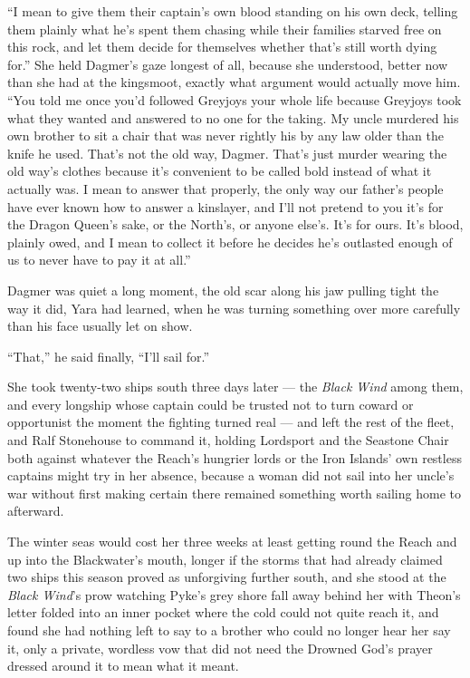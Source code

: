 “I mean to give them their captain’s own blood standing on his own deck, telling them plainly what he’s spent them chasing while their families starved free on this rock, and let them decide for themselves whether that’s still worth dying for.” She held Dagmer’s gaze longest of all, because she understood, better now than she had at the kingsmoot, exactly what argument would actually move him. “You told me once you’d followed Greyjoys your whole life because Greyjoys took what they wanted and answered to no one for the taking. My uncle murdered his own brother to sit a chair that was never rightly his by any law older than the knife he used. That’s not the old way, Dagmer. That’s just murder wearing the old way’s clothes because it’s convenient to be called bold instead of what it actually was. I mean to answer that properly, the only way our father’s people have ever known how to answer a kinslayer, and I’ll not pretend to you it’s for the Dragon Queen’s sake, or the North’s, or anyone else’s. It’s for ours. It’s blood, plainly owed, and I mean to collect it before he decides he’s outlasted enough of us to never have to pay it at all.”

Dagmer was quiet a long moment, the old scar along his jaw pulling tight the way it did, Yara had learned, when he was turning something over more carefully than his face usually let on show.

“That,” he said finally, “I’ll sail for.”

\sceneBreak

She took twenty-two ships south three days later — the \textit{Black Wind} among them, and every longship whose captain could be trusted not to turn coward or opportunist the moment the fighting turned real — and left the rest of the fleet, and Ralf Stonehouse to command it, holding Lordsport and the Seastone Chair both against whatever the Reach’s hungrier lords or the Iron Islands’ own restless captains might try in her absence, because a woman did not sail into her uncle’s war without first making certain there remained something worth sailing home to afterward.

The winter seas would cost her three weeks at least getting round the Reach and up into the Blackwater’s mouth, longer if the storms that had already claimed two ships this season proved as unforgiving further south, and she stood at the \textit{Black Wind}’s prow watching Pyke’s grey shore fall away behind her with Theon’s letter folded into an inner pocket where the cold could not quite reach it, and found she had nothing left to say to a brother who could no longer hear her say it, only a private, wordless vow that did not need the Drowned God’s prayer dressed around it to mean what it meant.

